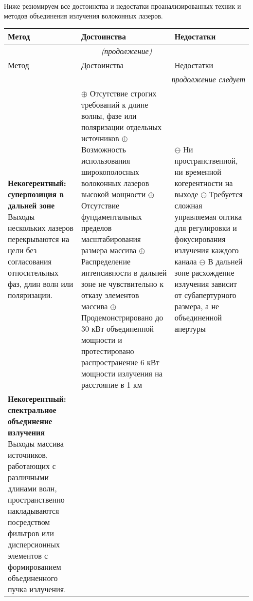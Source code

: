 Ниже резюмируем все достоинства и недостатки проанализированных техник и методов объединения излучения волоконных лазеров.
\newpage
\begin{longtable}[c]{ | p{4cm} | p{6cm} | p{6cm} |}
  \hline\hline\hline
  Метод & Достоинства & Недостатки \\ \hline
   \endfirsthead   \hline
  \multicolumn{3}{|c|}{\small\slshape (продолжение)}        \\ \hline
  Метод & Достоинства & Недостатки \\ \hline
   \endhead        \hline
 \multicolumn{3}{|r|}{\small\slshape продолжение следует}  \\ \hline
    \endfoot        \hline
    \endlastfoot
  \hline\hline
    \textbf{Некогерентный: суперпозиция в дальней зоне}
    \newline\newline
    Выходы нескольких лазеров перекрываются на цели без согласования относительных фаз, длин волн или поляризации. &
    $\oplus$ Отсутствие строгих требований к длине волны, фазе или поляризации отдельных источников
    \newline$\oplus$ Возможность использования широкополосных волоконных лазеров высокой мощности
    \newline$\oplus$ Отсутствие фундаментальных пределов масштабирования размера массива
    \newline$\oplus$ Распределение интенсивности в дальней зоне не чувствительно к отказу элементов массива
    \newline$\oplus$ Продемонстрировано до 30 кВт объединенной мощности и протестировано распространение 6 кВт мощности излучения на расстояние в 1 км
    &
    $\ominus$ Ни пространственной, ни временной когерентности на выходе
    \newline$\ominus$ Требуется сложная управляемая оптика для регулировки и фокусирования излучения каждого канала
    \newline$\ominus$ В дальней зоне расхождение излучения зависит от субапертурного размера, а не объединенной апертуры
    \\
  \hline
    \textbf{Некогерентный: спектральное объединение излучения}
    \newline\newline
    Выходы массива источников, работающих с различными длинами волн, пространственно накладываются посредством фильтров или дисперсионных элементов с формированием объединенного пучка излучения.

\end{longtable}
